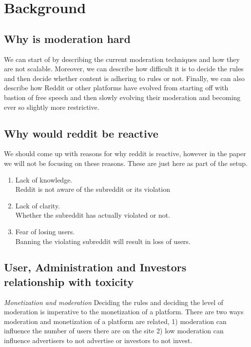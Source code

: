 \section{Background}

\subsection{Why is moderation hard}

We can start of by describing the current moderation techniques and how they are not scalable. Moreover, we can describe how difficult it is to decide the rules and then decide whether content is adhering to rules or not. Finally, we can also describe how Reddit or other platforms have evolved from starting off with bastion of free speech and then slowly evolving their moderation and becoming ever so slightly more restrictive.

\subsection{Why would reddit be reactive}
We should come up with reasons for why reddit is reactive, however in the paper we will not be focusing on these reasons. These are just here as part of the setup.

\begin{enumerate}
    \item Lack of knowledge. \\
    Reddit is not aware of the subreddit or its violation
    \item Lack of clarity. \\
    Whether the subreddit has actually violated or not. 
    \item Fear of losing users. \\
    Banning the violating subreddit will result in loss of users.
\end{enumerate}

\subsection{User, Administration and Investors relationship with toxicity}
\textit{Monetization and moderation}
Deciding the rules and deciding the level of moderation is imperative to the monetization of a platform. There are two ways moderation and monetization of a platform are related, 1) moderation can influence the number of users there are on the site 2) low moderation can influence advertisers to not advertise or investors to not invest.
